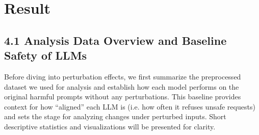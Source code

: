 \chapter{Result}

\section{4.1 Analysis Data Overview and Baseline Safety of LLMs}
Before diving into perturbation effects, we first summarize the preprocessed dataset we used for analysis and establish how each model performs on the original harmful prompts without any perturbations. This baseline provides context for how “aligned” each LLM is (i.e. how often it refuses unsafe requests) and sets the stage for analyzing changes under perturbed inputs. Short descriptive statistics and visualizations will be presented for clarity.


